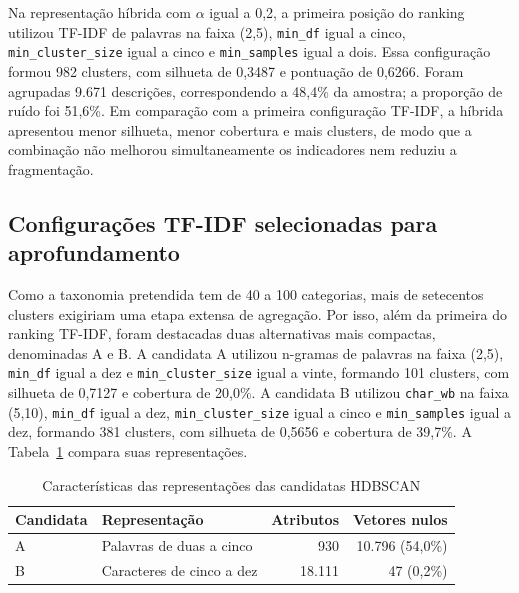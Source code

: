 \documentclass[english,brazilian]{UNISINOSmonografia}
\begin{document}
Na representação híbrida com $\alpha$ igual a 0,2, a primeira posição do ranking utilizou TF-IDF de palavras na faixa (2,5), \texttt{min\_df} igual a cinco, \texttt{min\_cluster\_size} igual a cinco e \texttt{min\_samples} igual a dois. Essa configuração formou 982 clusters, com silhueta de 0,3487 e pontuação de 0,6266. Foram agrupadas 9.671 descrições, correspondendo a 48,4\% da amostra; a proporção de ruído foi 51,6\%. Em comparação com a primeira configuração TF-IDF, a híbrida apresentou menor silhueta, menor cobertura e mais clusters, de modo que a combinação não melhorou simultaneamente os indicadores nem reduziu a fragmentação.

\subsection{Configurações TF-IDF selecionadas para aprofundamento}
\label{sec:res-hdbscan-candidatas}

Como a taxonomia pretendida tem de 40 a 100 categorias, mais de setecentos clusters exigiriam uma etapa extensa de agregação. Por isso, além da primeira do ranking TF-IDF, foram destacadas duas alternativas mais compactas, denominadas A e B. A candidata A utilizou n-gramas de palavras na faixa (2,5), \texttt{min\_df} igual a dez e \texttt{min\_cluster\_size} igual a vinte, formando 101 clusters, com silhueta de 0,7127 e cobertura de 20,0\%. A candidata B utilizou \texttt{char\_wb} na faixa (5,10), \texttt{min\_df} igual a dez, \texttt{min\_cluster\_size} igual a cinco e \texttt{min\_samples} igual a dez, formando 381 clusters, com silhueta de 0,5656 e cobertura de 39,7\%. A Tabela~\ref{tab:candidatas} compara suas representações.

\begin{table}[!htb]
    \caption{Características das representações das candidatas HDBSCAN}
    \label{tab:candidatas}
    \centering
    \small
    \begin{tabularx}{\textwidth}{lXrr}
        \hline
        \textbf{Candidata} & \textbf{Representação} & \textbf{Atributos} & \textbf{Vetores nulos}\\
        \hline
        A & Palavras de duas a cinco & 930 & 10.796 (54,0\%)\\
        B & Caracteres de cinco a dez & 18.111 & 47 (0,2\%)\\
        \hline
    \end{tabularx}
\end{table}
\end{document}
